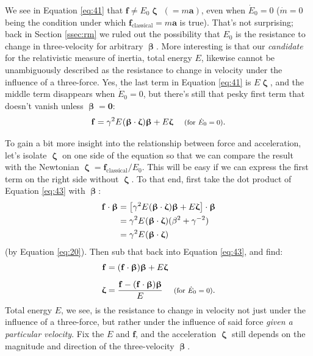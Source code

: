 \documentclass[12pt]{article}
\renewcommand{\vv}[1]{\mathbf{#1}}
\newcommand{\vvbeta}{\bm{\upbeta}}
\newcommand{\vvzeta}{\bm{\upzeta}}
\begin{document}
We see in Equation \ref{eq:41} that $\vv f \neq E_0 \vvzeta$ $( = m \vv a)$, even when $\dot{E}_0 = 0$ ($\dot{m} = 0$ being the condition under which $\vv f_\textrm{classical} = m \vv a$ is true). That's not surprising; back in Section \ref{ssec:rm} we ruled out the possibility that $E_0$ is the resistance to change in three-velocity for arbitrary $\vvbeta$. More interesting is that our \emph{candidate} for the relativistic measure of inertia, total energy $E$, likewise cannot be unambiguously described as the resistance to change in velocity under the influence of a three-force. Yes, the last term in Equation \ref{eq:41} is $E \vvzeta$, and the middle term disappears when $\dot{E}_0 = 0$, but there's still that pesky first term that doesn't vanish unless $\vvbeta = \vv 0$:
\begin{equation}\label{eq:43}
\vv f = \gamma^2 E \mkern1mu (\vvbeta \cdot \vvzeta) \vvbeta + E \vvzeta \quad \textrm{\footnotesize{ (for $\dot{E}_0 = 0$)}}.
\end{equation}

To gain a bit more insight into the relationship between force and acceleration, let's isolate $\vvzeta$ on one side of the equation so that we can compare the result with the Newtonian $\vvzeta = \vv f_{\mathrm{classical}} / E_0$. This will be easy if we can express the first term on the right side without $\vvzeta$. To that end, first take the dot product of Equation \ref{eq:43} with $\vvbeta$:
\begin{equation*}
\begin{split}
\vv f \cdot \vvbeta &= \left[ \gamma^2 E \mkern1mu (\vvbeta \cdot \vvzeta) \vvbeta + E \vvzeta \right] \cdot \vvbeta \\
&= \gamma^2 E \mkern1mu (\vvbeta \cdot \vvzeta)(\beta^2 + \gamma^{-2}) \\
&= \gamma^2 E \mkern1mu (\vvbeta \cdot \vvzeta)
\end{split}
\end{equation*}
(by Equation \ref{eq:20}). Then sub that back into Equation \ref{eq:43}, and find:
\begin{equation}\label{eq:44}
\begin{split}
\vv f &= (\vv f \cdot \vvbeta) \vvbeta + E \vvzeta \\[5pt]
\vvzeta &= \frac{\vv f - (\vv f \cdot \vvbeta) \vvbeta}{E} \quad \textrm{\footnotesize{ (for $\dot{E}_0 = 0$)}}.
\end{split}
\end{equation}
Total energy $E$, we see, is the resistance to change in velocity not just under the influence of a three-force, but rather under the influence of said force \emph{given a particular velocity}. Fix the $E$ and $\vv f$, and the acceleration $\vvzeta$ still depends on the magnitude and direction of the three-velocity $\vvbeta$.
\end{document}
